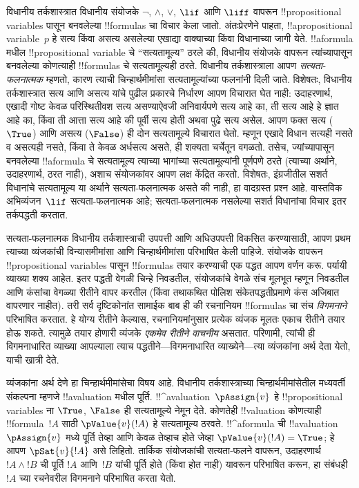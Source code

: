 \documentclass[../../../include/open-logic-section]{subfiles}
\begin{document}


विधानीय तर्कशास्त्रात विधानीय संयोजके
$\lnot$, $\land$, $\lor$, $\lif$ आणि $\liff$ वापरून
!!{propositional variable}s पासून बनवलेल्या !!{formula}s चा विचार
केला जातो. अंतःप्रेरणेने पाहता, !!a{propositional variable}~$p$
हे सत्य किंवा असत्य असलेल्या एखाद्या वाक्याच्या किंवा विधानाच्या
जागी येते. !!a{formula} मधील !!{propositional variable} चे
``सत्यतामूल्य'' ठरले की, विधानीय संयोजके वापरून त्यांच्यापासून
बनवलेल्या कोणत्याही !!{formula}s चे सत्यतामूल्यही ठरते. विधानीय
तर्कशास्त्राला आपण \emph{सत्यता-फलनात्मक} म्हणतो, कारण त्याची
चिन्हार्थमीमांसा सत्यतामूल्यांच्या फलनांनी दिली जाते. विशेषतः,
विधानीय तर्कशास्त्रात सत्य आणि असत्य यांचे पुढील प्रकारचे निर्धारण
आपण विचारात घेत नाही: उदाहरणार्थ, एखादी गोष्ट केवळ परिस्थितीवश
सत्य असण्याऐवजी अनिवार्यपणे सत्य आहे का, ती सत्य आहे हे ज्ञात आहे
का, किंवा ती आत्ता सत्य आहे की पूर्वी सत्य होती अथवा पुढे सत्य
असेल. आपण फक्त सत्य ($\True$) आणि असत्य ($\False$) ही दोन
सत्यतामूल्ये विचारात घेतो. म्हणून एखादे विधान सत्यही नसते व
असत्यही नसते, किंवा ते केवळ अर्धसत्य असते, ही शक्यता चर्चेतून
वगळतो. तसेच, ज्यांच्यापासून बनवलेल्या !!a{formula} चे सत्यतामूल्य
त्याच्या भागांच्या सत्यतामूल्यांनी पूर्णपणे ठरते (त्याच्या अर्थाने,
उदाहरणार्थ, ठरत नाही), अशाच संयोजकांवर आपण लक्ष केंद्रित करतो.
विशेषतः, इंग्रजीतील सशर्त विधानांचे सत्यतामूल्य या अर्थाने
सत्यता-फलनात्मक असते की नाही, हा वादग्रस्त प्रश्न आहे. वास्तविक
अभिव्यंजन~$\lif$ सत्यता-फलनात्मक आहे; सत्यता-फलनात्मक नसलेल्या सशर्त
विधानांचा विचार इतर तर्कपद्धती करतात.

सत्यता-फलनात्मक विधानीय तर्कशास्त्राची उपपत्ती आणि अधिउपपत्ती
विकसित करण्यासाठी, आपण प्रथम त्याच्या व्यंजकांची विन्यासमीमांसा
आणि चिन्हार्थमीमांसा परिभाषित केली पाहिजे. संयोजके वापरून
!!{propositional variable}s पासून !!{formula}s तयार करण्याची एक
पद्धत आपण वर्णन करू. पर्यायी व्याख्या शक्य आहेत. इतर पद्धती वेगळी
चिन्हे निवडतील, संयोजकांचे वेगळे संच मूलभूत म्हणून निवडतील आणि
कंसांचा वेगळ्या रीतीने वापर करतील (किंवा तथाकथित पोलिश
संकेतपद्धतीप्रमाणे कंस अजिबात वापरणार नाहीत). तरी सर्व दृष्टिकोनांत
सामाईक बाब ही की रचनानियम !!{formula}s चा संच \emph{विगमनाने}
परिभाषित करतात. हे योग्य रीतीने केल्यास, रचनानियमांनुसार प्रत्येक
व्यंजक मूलतः एकाच रीतीने तयार होऊ शकते. त्यामुळे तयार होणारी
व्यंजके \emph{एकमेव रीतीने वाचनीय} असतात. परिणामी, त्यांची ही
विगमनाधारित व्याख्या आपल्याला त्याच पद्धतीने---विगमनाधारित
व्याख्येने---त्या व्यंजकांना अर्थ देता येतो, याची खात्री देते.

व्यंजकांना अर्थ देणे हा चिन्हार्थमीमांसेचा विषय आहे. विधानीय
तर्कशास्त्राच्या चिन्हार्थमीमांसेतील मध्यवर्ती संकल्पना म्हणजे
!!a{valuation} मधील पूर्ति. !!^a{valuation}~$\pAssign{v}$ हे
!!{propositional variable}s ना $\True$, $\False$ ही सत्यतामूल्ये
नेमून देते. कोणतेही !!{valuation} कोणत्याही !!{formula}~$!A$
साठी $\pValue{v}(!A)$ हे सत्यतामूल्य ठरवते. !!^a{formula} ची
!!a{valuation}~$\pAssign{v}$ मध्ये पूर्ति तेव्हा आणि केवळ तेव्हाच
होते जेव्हा $\pValue{v}(!A) = \True$; हे आपण $\pSat{v}{!A}$ असे
लिहितो. तार्किक संयोजकांची सत्यता-फलने वापरून, उदाहरणार्थ
$!A \land !B$ ची पूर्ति $!A$ आणि~$!B$ यांची पूर्ति होते (किंवा
होत नाही) यावरून परिभाषित करून, हा संबंधही~$!A$ च्या रचनेवरील
विगमनाने परिभाषित करता येतो.
\end{document}
